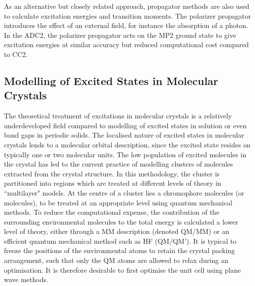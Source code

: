 As an alternative but closely related approach, propagator methods are also used to calculate excitation energies and transition moments. The polarizer propagator introduces the effect of an external field, for instance the absorption of a photon. In the \ac{ADC2}, the polarizer propagator acts on the \ac{MP2} ground state to give excitation energies at similar accuracy but reduced computational cost compared to \ac{CC}2.

\subsection{Modelling of Excited States in Molecular Crystals} \label{section: excited_states_crystals}
The theoretical treatment of excitations in molecular crystals is a relatively underdeveloped field compared to modelling of excited states in solution or even band gaps in periodic solids. The localised nature of excited states in molecular crystals lends to a molecular orbital description, since the excited state resides on typically one or two molecular units.\cite{Sauer1989} The low population of excited molecules in the crystal has led to the current practice of modelling clusters of molecules extracted from the crystal structure. In this methodology, the cluster is partitioned into regions which are treated at different levels of theory in ``multilayer" models. At the centre of a cluster lies a chromophore molecules (or molecules), to be treated at an appropriate level using quantum mechanical methods. To reduce the computational expense, the contribution of the surrounding environmental molecules to the total energy is calculated a lower level of theory, either through a \acf{MM} description (denoted QM/MM) or an efficient quantum mechanical method such as \ac{HF} (QM/QM').
It is typical to freeze the positions of the environmental atoms to retain the crystal packing arrangement, such that only the QM atoms are allowed to relax during an optimisation. It is therefore desirable to first optimise the unit cell using plane wave methods.\cite{Presti2016} 

